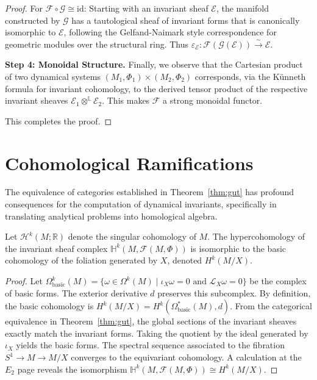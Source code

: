 \begin{proof}
For $\mathcal{F} \circ \mathcal{G} \cong \text{id}$: Starting with an invariant sheaf $\mathcal{E}$, the manifold constructed by $\mathcal{G}$ has a tautological sheaf of invariant forms that is canonically isomorphic to $\mathcal{E}$, following the Gelfand-Naimark style correspondence for geometric modules over the structural ring. Thus $\varepsilon_{\mathcal{E}}: \mathcal{F}(\mathcal{G}(\mathcal{E})) \xrightarrow{\sim} \mathcal{E}$.

\textbf{Step 4: Monoidal Structure.}
Finally, we observe that the Cartesian product of two dynamical systems $(M_1, \Phi_1) \times (M_2, \Phi_2)$ corresponds, via the Künneth formula for invariant cohomology, to the derived tensor product of the respective invariant sheaves $\mathcal{E}_1 \otimes^{\mathbb{L}} \mathcal{E}_2$. This makes $\mathcal{F}$ a strong monoidal functor.

This completes the proof.
\end{proof}

\section{Cohomological Ramifications}
\label{sec:ramifications}

The equivalence of categories established in Theorem~\ref{thm:gut} has profound consequences for the computation of dynamical invariants, specifically in translating analytical problems into homological algebra.

\begin{theorem}
Let $\mathcal{H}^k(M; \mathbb{R})$ denote the singular cohomology of $M$. The hypercohomology of the invariant sheaf complex $\mathbb{H}^k(M, \mathcal{F}(M, \Phi))$ is isomorphic to the basic cohomology of the foliation generated by $X$, denoted $H^k(M/X)$.
\end{theorem}

\begin{proof}
Let $\Omega_{\text{basic}}^k(M) = \{ \omega \in \Omega^k(M) \mid \iota_X \omega = 0 \text{ and } \mathcal{L}_X \omega = 0 \}$ be the complex of basic forms. The exterior derivative $d$ preserves this subcomplex. By definition, the basic cohomology is $H^k(M/X) = H^k(\Omega_{\text{basic}}^*(M), d)$. From the categorical equivalence in Theorem~\ref{thm:gut}, the global sections of the invariant sheaves exactly match the invariant forms. Taking the quotient by the ideal generated by $\iota_X$ yields the basic forms. The spectral sequence associated to the fibration $S^1 \to M \to M/X$ converges to the equivariant cohomology. A calculation at the $E_2$ page reveals the isomorphism $\mathbb{H}^k(M, \mathcal{F}(M, \Phi)) \cong H^k(M/X)$.
\end{proof}

